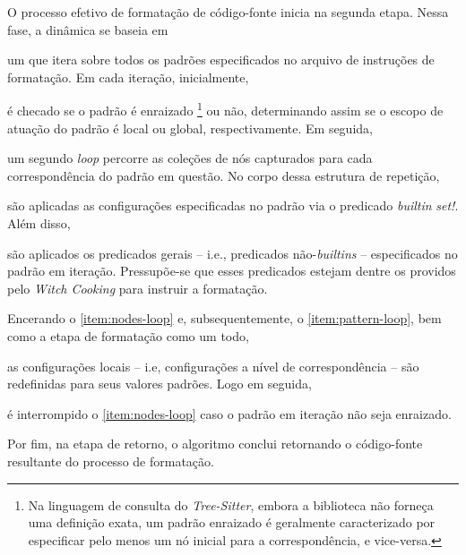 \documentclass
  [11pt,a4paper,english,brazil,openright,sumario=tradicional,twoside]
  {abntex2}
\newcommand{\treesitter}{\textit{Tree-Sitter}\xspace}
\newcommand{\witchcooking}{\textit{Witch Cooking}\xspace}
\begin{document}
{{  O processo efetivo de formatação de código-fonte inicia na segunda etapa.
  Nessa fase, a dinâmica se baseia em
  \begin{inparaenum}
    \item \label{item:pattern-loop} um \textit{} que itera sobre
          todos os padrões especificados no arquivo de instruções de
          formatação. Em cada iteração, inicialmente,
    \item é checado se o padrão é enraizado%
          \footnote
            { Na linguagem de consulta do \treesitter, embora a biblioteca não
              forneça uma definição exata, um padrão enraizado é geralmente
              caracterizado por especificar pelo menos um nó inicial para a
              correspondência, e vice-versa.}
          ou não, determinando assim se o escopo de atuação do padrão é local
          ou global, respectivamente. Em seguida,
    \item \label{item:nodes-loop} um segundo \textit{loop} percorre as coleções
          de nós capturados para cada correspondência do padrão em questão. No
          corpo dessa estrutura de repetição,
    \item são aplicadas as configurações especificadas no padrão via o
          predicado \textit{builtin} \textit{set!}. Além disso,
    \item são aplicados os predicados gerais -- i.e., predicados
          não-\textit{builtins} -- especificados no padrão em iteração.
          Pressupõe-se que esses predicados estejam dentre os providos pelo
          \witchcooking para instruir a formatação.

          Encerando o \cref{item:nodes-loop} e, subsequentemente, o
          \cref{item:pattern-loop}, bem como a etapa de formatação como um
          todo,
    \item as configurações locais -- i.e, configurações a nível de
          correspondência -- são redefinidas para seus valores padrões. Logo em
          seguida,
    \item é interrompido o \cref{item:nodes-loop} caso o padrão em iteração não
          seja enraizado.
  \end{inparaenum}
  Por fim, na etapa de retorno, o algoritmo conclui retornando o código-fonte
  resultante do processo de formatação.

}}
\end{document}
